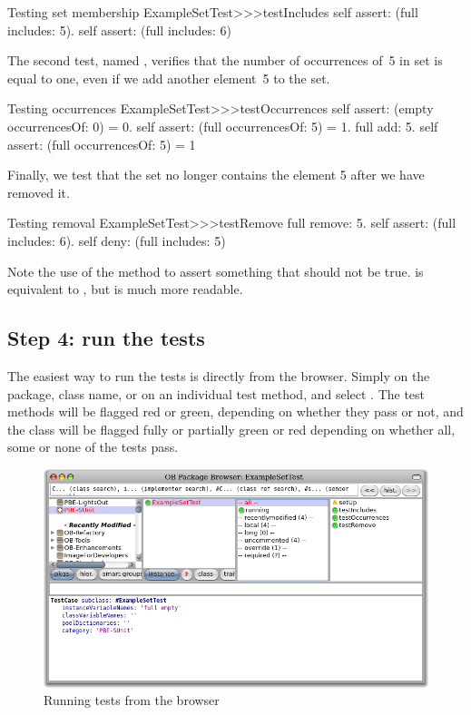 \documentclass[a4paper,10pt,twoside]{book}
\begin{document}
\begin{method}[testIncludes]{Testing set membership}
ExampleSetTest>>>testIncludes
	self assert: (full includes: 5).
	self assert: (full includes: 6)
\end{method}

The second test, named , verifies that the
number of occurrences of~5 in  set is equal to one, even if we
add another element~5 to the set.

\begin{method}[testOccurrences]{Testing occurrences}
ExampleSetTest>>>testOccurrences
	self assert: (empty occurrencesOf: 0) = 0.
	self assert: (full occurrencesOf: 5) = 1.
	full add: 5.
	self assert: (full occurrencesOf: 5) = 1
\end{method}

Finally, we test that the set no
longer contains the element 5 after we have removed it.

\begin{method}[testRemove]{Testing removal}
ExampleSetTest>>>testRemove
	full remove: 5.
	self assert: (full includes: 6).
	self deny: (full includes: 5)
\end{method}

\noindent
Note the use of the method  to assert something that should not be true.
 is equivalent to , but is much more readable.
\subsection{Step 4: run the tests}

The easiest way to run the tests is directly from the browser.  Simply \actclick on the package, class name, or on an individual test method, and select .
The test methods will be flagged red or green, depending on whether they pass or not, and the class will be flagged fully or partially green or red depending on whether all, some or none of the tests pass.

\begin{figure}[tbh]
  \begin{center}
	\includegraphics[width=\linewidth]{browser-tests}
	\caption{Running \sunit tests from the browser}
	\label{fig:browser-tests}
  \end{center}
\end{figure}
\end{document}
